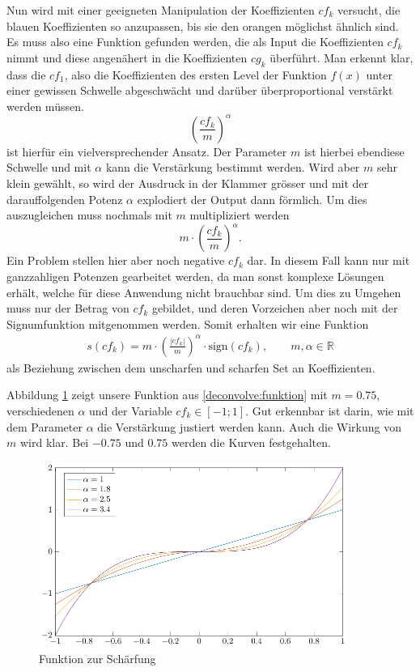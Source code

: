 Nun wird mit einer geeigneten Manipulation der Koeffizienten $cf_k$ versucht, die blauen Koeffizienten so anzupassen, bis sie den orangen möglichst ähnlich sind.
Es muss also eine Funktion gefunden werden, die als Input die Koeffizienten $cf_k$ nimmt und diese angenähert in die Koeffizienten $cg_k$ überführt.
Man erkennt klar, dass die $cf_1$, also die Koeffizienten des ersten Level der Funktion $f(x)$ unter einer gewissen Schwelle abgeschwächt und darüber überproportional verstärkt werden müssen.
$$\left( \frac{cf_k}{m}\right)^\alpha$$
ist hierfür ein vielversprechender Ansatz.
Der Parameter $m$ ist hierbei ebendiese Schwelle und mit $\alpha$ kann die Verstärkung bestimmt werden.
Wird aber $m$ sehr klein gewählt, so wird der Ausdruck in der Klammer grösser und mit der darauffolgenden Potenz $\alpha$ explodiert der Output dann förmlich.
Um dies auszugleichen muss nochmals mit $m$ multipliziert werden
$$m\cdot \left( \frac{cf_k}{m}\right)^\alpha.$$
Ein Problem stellen hier aber noch negative $cf_k$ dar. In diesem Fall kann nur mit ganzzahligen Potenzen gearbeitet werden, da man sonst komplexe Lösungen erhält, welche für diese Anwendung nicht brauchbar sind.
Um dies zu Umgehen muss nur der Betrag von $cf_k$ gebildet, und deren Vorzeichen aber noch mit der Signumfunktion mitgenommen werden.
Somit erhalten wir eine Funktion
\begin{align}
s(cf_k)=m\cdot \left(\frac{|cf_k|}{m}\right)^{\alpha}\cdot \text{sign}(cf_k), \qquad m,\alpha\in\mathbb{R}
\label{deconvolve:funktion}
\end{align}
als Beziehung zwischen dem \glqq unscharfen\grqq{} und \glqq scharfen\grqq{} Set an Koeffizienten.

Abbildung \ref{deconvolve:function} zeigt unsere Funktion aus \eqref{deconvolve:funktion} mit $m=0.75$, verschiedenen $\alpha$ und der Variable $cf_k\in[-1;1]$.
Gut erkennbar ist darin, wie mit dem Parameter $\alpha$ die Verstärkung justiert werden kann.
Auch die Wirkung von $m$ wird klar.
Bei $-0.75$ und $0.75$ werden die Kurven festgehalten.
\begin{figure}[h]
\centering
\includegraphics[width=0.9\textwidth]{./papers/deconvolve/pictures/function.pdf}
\caption{Funktion zur Schärfung\label{deconvolve:function}}
\end{figure}

